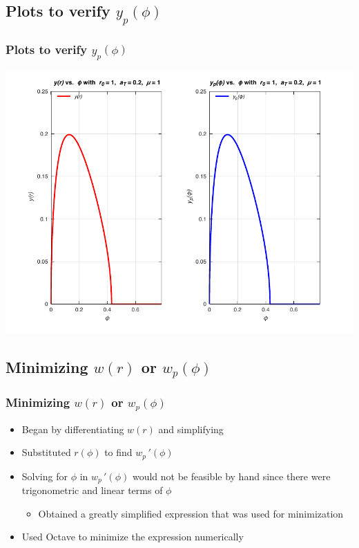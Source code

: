 \documentclass{beamer}
\newcommand{\sectit}[1]{
    \section{\texorpdfstring{#1}{}}
    \frametitle{\texorpdfstring{#1}{}}
}
\begin{document}
\begin{frame}
    \sectit{Plots to verify $y_p(\phi)$}

    \begin{center}
        \includegraphics[scale=0.7]{../plots/partB.pdf}
    \end{center}
\end{frame}

\begin{frame}
    \sectit{Minimizing $w(r)$ or $w_p(\phi)$}

    \begin{itemize}
        \item Began by differentiating $w(r)$ and simplifying
        \item Substituted $r(\phi)$ to find $w_p\,'(\phi)$
        \item Solving for $\phi$ in $w_p\,'(\phi)$ would not be feasible by hand since there were trigonometric and linear terms of $\phi$
        \begin{itemize}
            \item Obtained a greatly simplified expression that was used for minimization
        \end{itemize}
        \item Used Octave to minimize the expression numerically
    \end{itemize}

\end{frame}
\end{document}
